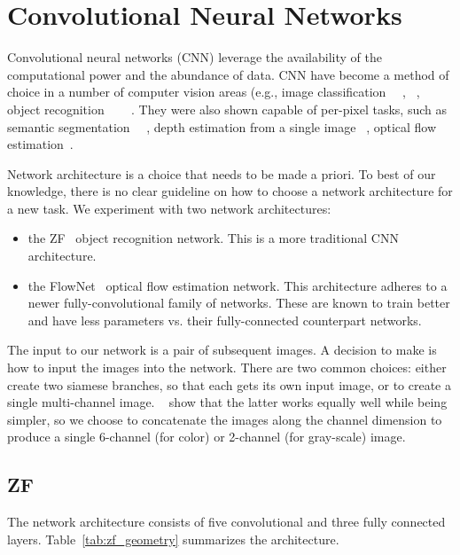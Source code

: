 \section{Convolutional Neural Networks}

Convolutional neural networks (CNN) leverage the availability of the
computational power and the abundance of data.  CNN have become a
method of choice in a number of computer vision areas (e.g., image
classification~\cite{krizhevsky2012imagenet} ~\cite{simonyan2014very},
~\cite{szegedy2015going}, object recognition
~\cite{sermanet2013overfeat}~\cite{girshick2014rich}
~\cite{he2014spatial}.  They were also shown capable of per-pixel
tasks, such as semantic segmentation
~\cite{ning2005toward}~\cite{gupta2014learning}, depth estimation from
a single image ~\cite{liu2016learning}, optical flow
estimation~\cite{fischer2015flownet}.

Network architecture is a choice that needs to be made a priori.  To
best of our knowledge, there is no clear guideline on how to choose a
network architecture for a new task.  We experiment with two network architectures:

\begin{itemize}
\item the ZF~\cite{DBLP:journals/corr/ZeilerF13} object recognition
  network.  This is a more traditional CNN architecture.
\item the FlowNet~\cite{fischer2015flownet} optical flow estimation
  network.  This architecture adheres to a newer fully-convolutional
  family of networks.  These are known to train better and have less
  parameters vs. their fully-connected counterpart networks.
\end{itemize}

The input to our network is a pair of subsequent images.  A decision
to make is how to input the images into the network.  There are two
common choices: either create two siamese branches, so that each gets
its own input image, or to create a single multi-channel image.
~\cite{fischer2015flownet} show that the latter works equally well
while being simpler, so we choose to concatenate the images along the
channel dimension to produce a single 6-channel (for color) or
2-channel (for gray-scale) image.

\subsection{ZF}

The network architecture consists of five convolutional and three fully connected layers.  Table~\ref{tab:zf_geometry} summarizes the architecture.


